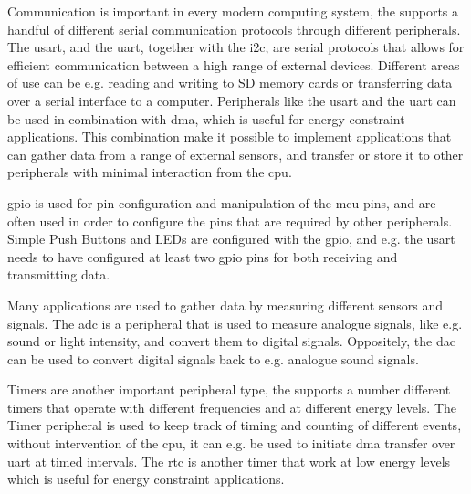 Communication is important in every modern computing system, the {\gecko} supports a handful of different serial communication protocols through different peripherals.
The \gls{usart}, and the \gls{uart}, together with the \gls{i2c}, are serial protocols that allows for efficient communication between a high range of external devices.
Different areas of use can be e.g. reading and writing to SD memory cards or transferring data over a serial interface to a computer.
Peripherals like the \gls{usart} and the \gls{uart} can be used in combination with \gls{dma}, which is useful for energy constraint applications.
This combination make it possible to implement applications that can gather data from a range of external sensors, and transfer or store it to other peripherals with minimal interaction from the \gls{cpu}.

\gls{gpio} is used for pin configuration and manipulation of the \gls{mcu} pins, and are often used in order to configure the pins that are required by other peripherals.
Simple Push Buttons and LEDs are configured with the \gls{gpio}, and e.g. the \gls{usart} needs to have configured at least two \gls{gpio} pins for both receiving and transmitting data.

Many applications are used to gather data by measuring different sensors and signals.
The \gls{adc} is a peripheral that is used to measure analogue signals, like e.g. sound or light intensity, and convert them to digital signals.
Oppositely, the \gls{dac} can be used to convert digital signals back to e.g. analogue sound signals.

Timers are another important peripheral type, the {\gecko} supports a number different timers that operate with different frequencies and at different energy levels.
The Timer peripheral is used to keep track of timing and counting of different events, without intervention of the \gls{cpu}, it can e.g. be used to initiate \gls{dma} transfer over \gls{uart} at timed intervals.
The \gls{rtc} is another timer that work at low energy levels which is useful for energy constraint applications.

